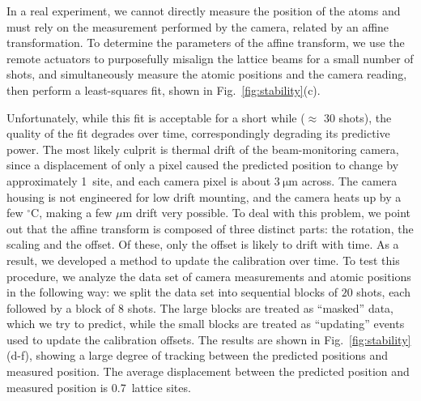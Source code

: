 \documentclass[twocolumn,aps,pra,showpacs,preprintnumbers,bibnotes]{revtex4-1}
\newcommand\unit[2]{\ensuremath{#1~\mathrm{{#2}}}}
\begin{document}
In a real experiment, we cannot directly measure the position of the atoms and must rely on the measurement performed by the camera, related by an affine transformation.
To determine the parameters of the affine transform, we use the remote actuators to purposefully misalign the lattice beams for a small number of shots, and simultaneously measure the atomic positions and the camera reading, then perform a least-squares fit, shown in Fig.~\ref{fig:stability}(c).

Unfortunately, while this fit is acceptable for a short while ($\approx$ 30 shots), the quality of the fit degrades over time, correspondingly degrading its predictive power.
The most likely culprit is thermal drift of the beam-monitoring camera, since a displacement of only a pixel caused the predicted position to change by approximately 1~site, and each camera pixel is about \unit{3}{\mu{}m} across.
The camera housing is not engineered for low drift mounting, and the camera heats up by a few $^\circ$C, making a few $\mu$m drift very possible.
To deal with this problem, we point out that the affine transform is composed of three distinct parts: the rotation, the scaling and the offset.
Of these, only the offset is likely to drift with time.
As a result, we developed a method to update the calibration over time. To test this procedure, we analyze the data set of camera measurements and atomic positions in the following way: we split the data set into sequential blocks of $20$ shots, each followed by a block of $8$ shots.
The large blocks are treated as ``masked'' data, which we try to predict, while the small blocks are treated as ``updating'' events used to update the calibration offsets.
The results are shown in Fig.~\ref{fig:stability}(d-f), showing a large degree of tracking between the predicted positions and measured position. The average displacement between the predicted position and measured position is 0.7~lattice sites.
\end{document}
